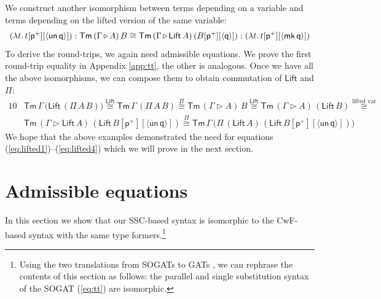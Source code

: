 \documentclass[submission,copyright,creativecommons]{eptcs}
\newcommand{\Tm}{\mathsf{Tm}}
\newcommand{\p}{\mathsf{p}}
\newcommand{\q}{\mathsf{q}}
\newcommand{\ext}{\mathop{\triangleright}}
\newcommand{\Lift}{\mathsf{Lift}}
\newcommand{\mk}{\mathsf{mk}}
\newcommand{\un}{\mathsf{un}}
\begin{document}
We construct another isomorphism between terms depending on a variable and
terms depending on the lifted version of the same variable:
\begin{equation}\label{eq:liftvar}
(\lambda t\ldotp t[\p^+][\langle\un\,\q\rangle]) : \Tm\,(\Gamma\ext A)\,B \cong \Tm\,(\Gamma\ext\Lift\,A)\,(B[\p^+][\langle\q\rangle]) : (\lambda t\ldotp t[\p^+][\langle\mk\,\q\rangle])
\end{equation}
To derive the round-trips, we again need admissible equations. We prove
the first round-trip equality in Appendix \ref{app:tt}, the other
is analogous.
Once we have all the above isomorphisms, we can compose them to obtain commutation of $\Lift$ and $\Pi$:
\begin{alignat*}{10}
  & \Tm\,\Gamma\,\big(\Lift\,(\Pi\,A\,B)\big) \overset{\text{$\Lift$}}{\cong}
  \Tm\,\Gamma\,(\Pi\,A\,B) \overset{\text{$\Pi$}}{\cong} 
  \Tm\,(\Gamma\ext A)\,B \overset{\text{$\Lift$}}{\cong} 
  \Tm\,(\Gamma\ext A)\,(\Lift\,B) \overset{\text{lifted var}}{\cong} \\
  & \Tm\,(\Gamma\ext \Lift\,A)\,(\Lift\,B[\p^+][\langle\un\,\q\rangle]) \overset{\text{$\Pi$}}{\cong}
  \Tm\,\Gamma\,\big(\Pi\,(\Lift\,A)\,(\Lift\,B[\p^+][\langle\un\,\q\rangle])\big)
\end{alignat*}
We hope that the above examples demonstrated the need for equations
(\ref{eq:lifted1})--(\ref{eq:lifted4}) which we will prove in the next
section.

% 


\section{Admissible equations}
\label{sec:admissible}

In this section we show that our SSC-based syntax is isomorphic to the
CwF-based syntax with the same type formers.\footnote{Using the two translations from SOGATs to GATs
\cite{DBLP:conf/fscd/KaposiX24}, we can rephrase the contents of this
section as follows: the parallel and single substitution syntax of the SOGAT (\ref{eq:tt}) are
isomorphic.}
\end{document}
